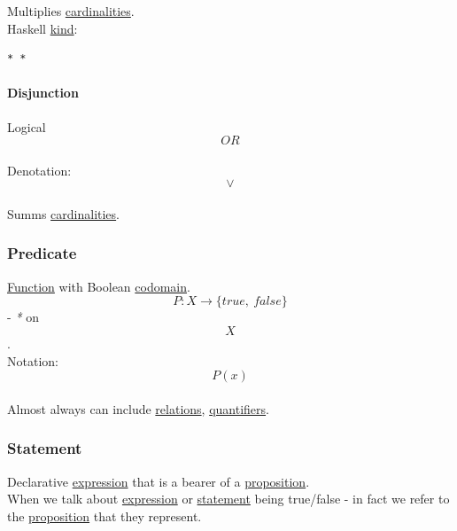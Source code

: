\documentclass[11pt]{article}
\begin{document}
Multiplies \hyperref[org54cdea2]{cardinalities}.\\

Haskell \hyperref[org19ec4cb]{kind}:\\
\begin{verbatim}
* *
\end{verbatim}

\paragraph{\label{org29ff7d6}Disjunction}
\label{sec:orgb161903}
Logical $$ OR $$\\
Denotation:\\
$$ \lor $$\\

Summs \hyperref[org54cdea2]{cardinalities}.\\

\subsubsection{\label{orgf52abe4}Predicate}
\label{sec:org30a04f9}
\hyperref[orgeb5cddb]{Function} with Boolean \hyperref[orgee70232]{codomain}.\\
$$ P: X \to \{ true, \ false \} $$ - \emph{*} on $$ X $$.\\

Notation: $$ P(x) $$\\

Almost always can include \hyperref[org5e14e7d]{relations}, \hyperref[orga67c681]{quantifiers}.\\

\subsubsection{\label{org0fdd00d}Statement}
\label{sec:orgf67c221}
Declarative \hyperref[org667db83]{expression} that is a bearer of a \hyperref[org78bac32]{proposition}.\\

When we talk about \hyperref[org667db83]{expression} or \hyperref[org0fdd00d]{statement} being true/false - in fact we refer to the \hyperref[org78bac32]{proposition} that they represent.\\
\end{document}
